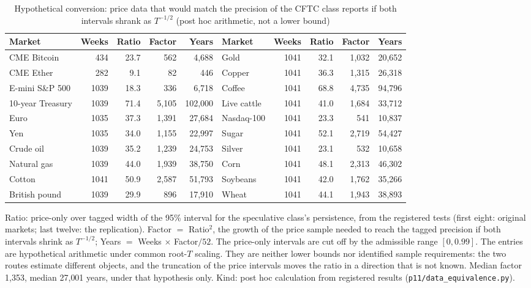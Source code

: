 \documentclass[12pt]{article}
\theoremstyle{definition}
\theoremstyle{remark}
\begin{document}
\begin{table}[!htbp]\centering\footnotesize
\begin{threeparttable}
\caption{Hypothetical conversion: price data that would match the precision of the CFTC class reports if both intervals shrank as $T^{-1/2}$ (post hoc arithmetic, not a lower bound)}\label{tab:dataequiv}
\setlength{\tabcolsep}{2.5pt}
\begin{tabular}{lrrrr@{\hspace{10pt}}lrrrr}
\toprule
Market & Weeks & Ratio & Factor & Years & Market & Weeks & Ratio & Factor & Years\\
\midrule
CME Bitcoin & 434 & 23.7 & 562 & 4{,}688 & Gold & 1041 & 32.1 & 1{,}032 & 20{,}652\\
CME Ether & 282 & 9.1 & 82 & 446 & Copper & 1041 & 36.3 & 1{,}315 & 26{,}318\\
E-mini S\&P 500 & 1039 & 18.3 & 336 & 6{,}718 & Coffee & 1041 & 68.8 & 4{,}735 & 94{,}796\\
10-year Treasury & 1039 & 71.4 & 5{,}105 & 102{,}000 & Live cattle & 1041 & 41.0 & 1{,}684 & 33{,}712\\
Euro & 1035 & 37.3 & 1{,}391 & 27{,}684 & Nasdaq-100 & 1041 & 23.3 & 541 & 10{,}837\\
Yen & 1035 & 34.0 & 1{,}155 & 22{,}997 & Sugar & 1041 & 52.1 & 2{,}719 & 54{,}427\\
Crude oil & 1039 & 35.2 & 1{,}239 & 24{,}753 & Silver & 1041 & 23.1 & 532 & 10{,}658\\
Natural gas & 1039 & 44.0 & 1{,}939 & 38{,}750 & Corn & 1041 & 48.1 & 2{,}313 & 46{,}302\\
Cotton & 1041 & 50.9 & 2{,}587 & 51{,}793 & Soybeans & 1041 & 42.0 & 1{,}762 & 35{,}266\\
British pound & 1039 & 29.9 & 896 & 17{,}910 & Wheat & 1041 & 44.1 & 1{,}943 & 38{,}893\\
\bottomrule
\end{tabular}
\begin{tablenotes}\footnotesize\item Ratio: price-only over tagged width of the 95\% interval for the speculative class's persistence, from the registered tests (first eight: original markets; last twelve: the replication). Factor $=$ Ratio$^2$, the growth of the price sample needed to reach the tagged precision if both intervals shrink as $T^{-1/2}$; Years $=$ Weeks $\times$ Factor$/52$. The price-only intervals are cut off by the admissible range $[0,0.99]$. The entries are hypothetical arithmetic under common root-$T$ scaling. They are neither lower bounds nor identified sample requirements: the two routes estimate different objects, and the truncation of the price intervals moves the ratio in a direction that is not known. Median factor 1{,}353, median 27{,}001 years, under that hypothesis only. Kind: post hoc calculation from registered results (\texttt{p11/data\_equivalence.py}).\end{tablenotes}
\end{threeparttable}
\end{table}
\end{document}
